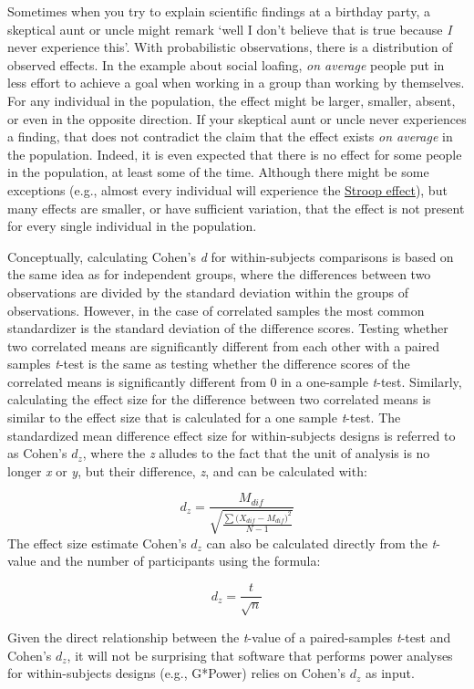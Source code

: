 \documentclass[
  oneside]{book}
\begin{document}
Sometimes when you try to explain scientific findings at a birthday party, a skeptical aunt or uncle might remark `well I don't believe that is true because \emph{I} never experience this'. With probabilistic observations, there is a distribution of observed effects. In the example about social loafing, \emph{on average} people put in less effort to achieve a goal when working in a group than working by themselves. For any individual in the population, the effect might be larger, smaller, absent, or even in the opposite direction. If your skeptical aunt or uncle never experiences a finding, that does not contradict the claim that the effect exists \emph{on average} in the population. Indeed, it is even expected that there is no effect for some people in the population, at least some of the time. Although there might be some exceptions (e.g., almost every individual will experience the \href{https://en.wikipedia.org/wiki/Stroop_effect}{Stroop effect}), but many effects are smaller, or have sufficient variation, that the effect is not present for every single individual in the population.

Conceptually, calculating Cohen's \emph{d} for within-subjects comparisons is based on the same idea as for independent groups, where the differences between two observations are divided by the standard deviation within the groups of observations. However, in the case of correlated samples the most common standardizer is the standard deviation of the difference scores. Testing whether two correlated means are significantly different from each other with a paired samples \emph{t}-test is the same as testing whether the difference scores of the correlated means is significantly different from 0 in a one-sample \emph{t}-test. Similarly, calculating the effect size for the difference between two correlated means is similar to the effect size that is calculated for a one sample \emph{t}-test. The standardized mean difference effect size for within-subjects designs is referred to as Cohen's \(d_z\), where the \emph{z} alludes to the fact that the unit of analysis is no longer \emph{x} or \emph{y}, but their difference, \emph{z}, and can be calculated with:

\[d_z = \frac{M_{dif}}{\sqrt{\frac{\sum{({X_{dif}-M_{dif})}}^2}{N-1}}}\]
The effect size estimate Cohen's \(d_z\) can also be calculated directly from the \emph{t}-value and the number of participants using the formula:

\[d_z = \frac{t}{\sqrt{n}}\]

Given the direct relationship between the \emph{t}-value of a paired-samples \emph{t}-test and Cohen's \(d_z\), it will not be surprising that software that performs power analyses for within-subjects designs (e.g., G*Power) relies on Cohen's \(d_z\) as input.
\end{document}
